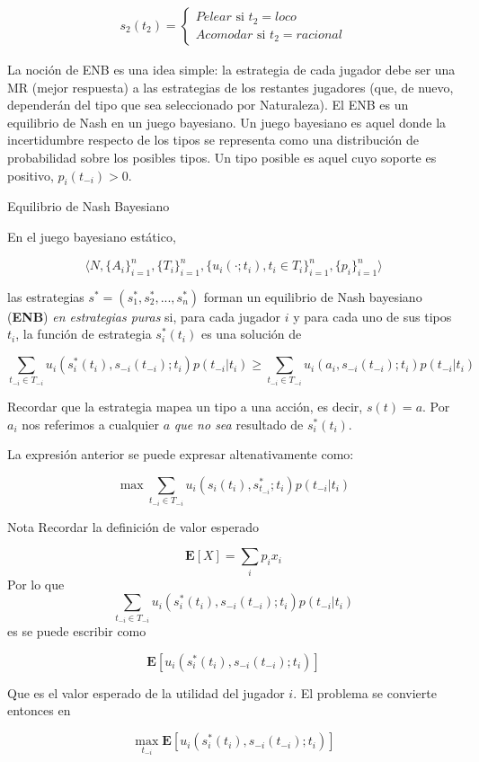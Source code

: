 \documentclass[12pt]{article}
\begin{document}
\begin{align*}
	s_2(t_2) =
	\begin{cases}
		Pelear \text{ si } t_2 = loco \\
		Acomodar \text{ si } t_2 = racional
	\end{cases}
\end{align*}


La noción de ENB es una idea simple: la estrategia de cada jugador debe ser una MR (mejor respuesta) a las estrategias de los restantes jugadores (que, de nuevo, dependerán del tipo que sea seleccionado por Naturaleza). El ENB es un equilibrio de Nash en un juego bayesiano. Un juego bayesiano es aquel donde la incertidumbre respecto de los tipos se representa como una distribución de probabilidad sobre los posibles tipos. Un tipo posible es aquel cuyo soporte es positivo, $p_i(t_{-i})>0$.

\begin{mybox}{Equilibrio de Nash Bayesiano}
	\begin{defi}
		En el juego bayesiano estático,

		\[ \langle N, \{A_i \}_{i=1}^n, \{ T_i \}_{i=1}^n, \{u_i(\cdot; t_i ), t_i \in T_i\}_{i=1}^n, \{ p_i \}_{i=1}^n \rangle \]

		las estrategias $s^* = (s_1^*, s_2^*, ..., s_n^*)$ forman un equilibrio de Nash bayesiano (\textbf{ENB}) \textit{en estrategias puras} si, para cada jugador $i$ y para cada uno de sus tipos $t_i$, la función de estrategia $s_i^*(t_i)$ es una solución de

		\[ \sum_{t_{-i} \in T_{-i}} u_i(s_i^*(t_i), s_{-i}(t_{-i}); t_i)p(t_{-i} | t_i) \geq
			\sum_{t_{-i} \in T_{-i}} u_i(a_i, s_{-i}(t_{-i}); t_i)p(t_{-i} | t_i)
		\]

		Recordar que la estrategia mapea un tipo a una acción, es decir, $s(t) = a$. Por $a_i$ nos referimos a cualquier {\color{blue}$a$} \textit{que no sea} resultado de $s_{i}^*(t_i)$.

		La expresión anterior se puede expresar altenativamente como:

		\[\max \sum_{t_{-i} \in T_{-i}} u_i(s_i(t_i), s_{t_{-i}}^*; t_i)p(t_{-i} | t_i) \]

	\end{defi}
\end{mybox}

\begin{summarybox}[colback=red!15]{Nota}
	Recordar la definición de valor esperado

	\[
		\textbf{E}[X] = \sum_i p_i x_i
	\]
	Por lo que
	\[ \sum_{t_{-i} \in T_{-i}} u_i(s_i^*(t_i), s_{-i}(t_{-i}); t_i)p(t_{-i} | t_i) \]
	es se puede escribir como

	\[
		\textbf{E}[u_i(s_i^*(t_i), s_{-i}(t_{-i}); t_i)]
	\]

	Que es el valor esperado de la utilidad del jugador $i$. El problema se convierte entonces en

	\[
		\max_{t_{-i}} \textbf{E}[u_i(s_i^*(t_i), s_{-i}(t_{-i}); t_i)]
	\]

\end{summarybox}
\end{document}
